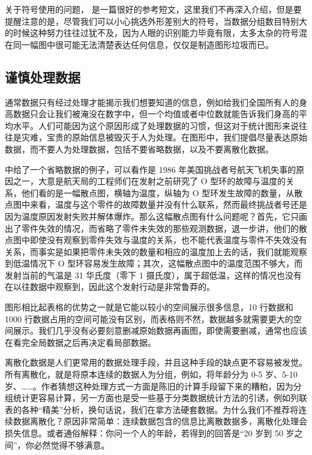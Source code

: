 \documentclass[
  b5paper,
  UTF8,twoside]{book}
\begin{document}
关于符号使用的问题，\citet{Robinson03} 是一篇很好的参考短文，这里我们不再深入介绍，但是要提醒注意的是，尽管我们可以小心挑选外形差别大的符号，当数据分组数目特别大的时候这种努力往往过犹不及，因为人眼的识别能力毕竟有限，太多太杂的符号混在同一幅图中很可能无法清楚表达任何信息，仅仅是制造图形垃圾而已。

\subsection{谨慎处理数据}\label{subsec:data-processing}

通常数据只有经过处理才能揭示我们想要知道的信息，例如给我们全国所有人的身高数据只会让我们被淹没在数字中，但一个均值或者中位数就能告诉我们身高的平均水平。人们可能因为这个原因形成了处理数据的习惯，但这对于统计图形来说往往是灾难，宝贵的原始信息被毁灭于人为处理。在图形中，我们提倡尽量表达原始数据，而不要人为处理数据，包括不要省略数据，以及不要离散化数据。

\citet{Cleveland85} 中给了一个省略数据的例子，可以看作是 1986 年美国挑战者号航天飞机失事的原因之一，大意是航天局的工程师们在发射之前研究了 O 型环的故障与温度的关系，他们看的是一幅散点图，横轴为温度，纵轴为 O 型环发生故障的数量，从散点图中来看，温度与这个零件的故障数量并没有什么联系，然而最终挑战者号还是因为温度原因发射失败并解体爆炸。那么这幅散点图有什么问题呢？首先，它只画出了零件失效的情况，而省略了零件未失效的那些观测数据，退一步讲，他们的散点图中即使没有观察到零件失效与温度的关系，也不能代表温度与零件不失效没有关系，而事实是如果把零件未失效的数量和相应的温度加上去的话，我们就能观察到低温情况下 O 型环容易发生故障；其次，这幅散点图中的温度范围不够大，而发射当前的气温是 31 华氏度（零下 1 摄氏度），属于超低温，这样的情况也没有在以往数据中观察到，因此这个发射行动是非常鲁莽的。

图形相比起表格的优势之一就是它能以较小的空间展示很多信息，10 行数据和 1000 行数据占用的空间可能没有区别，而表格则不然，数据越多就需要更大的空间展示。我们几乎没有必要刻意删减原始数据再画图，即使需要删减，通常也应该在看完全局数据之后再决定看局部数据。

离散化数据是人们更常用的数据处理手段，并且这种手段的缺点更不容易被发觉。所有离散化，就是将原本连续的数据人为分组，例如，将年龄分为 0-5 岁、5-10 岁、\ldots\ldots。作者猜想这种处理方式一方面是陈旧的计算手段留下来的糟粕，因为分组统计更容易计算，另一方面也是受一些基于分类数据统计方法的引诱，例如列联表的各种``精美''分析，换句话说，我们在拿方法硬套数据。为什么我们不推荐将连续数据离散化？原因非常简单：连续数据包含的信息比离散数据多，离散化处理会损失信息。或者通俗解释：你问一个人的年龄，若得到的回答是``20 岁到 50 岁之间''，你必然觉得不够满意。
\end{document}
